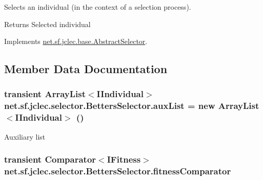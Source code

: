 Selects an individual (in the context of a selection process).

\begin{DoxyReturn}{Returns}
Selected individual
\end{DoxyReturn}
 

Implements \hyperlink{classnet_1_1sf_1_1jclec_1_1base_1_1_abstract_selector_aa2ccb539c608db9c14ebbc763807b95a}{net.\-sf.\-jclec.\-base.\-Abstract\-Selector}.



\subsection{Member Data Documentation}
\hypertarget{classnet_1_1sf_1_1jclec_1_1selector_1_1_betters_selector_ab1d403d53ac1f1cbb3d0ddd51fd0e160}{
\subsubsection[{aux\-List}]{\setlength{\rightskip}{0pt plus 5cm}transient Array\-List$<${\bf I\-Individual}$>$ net.\-sf.\-jclec.\-selector.\-Betters\-Selector.\-aux\-List = new Array\-List$<${\bf I\-Individual}$>$ ()\hspace{0.3cm}{\ttfamily [protected]}}}\label{classnet_1_1sf_1_1jclec_1_1selector_1_1_betters_selector_ab1d403d53ac1f1cbb3d0ddd51fd0e160}
Auxiliary list \hypertarget{classnet_1_1sf_1_1jclec_1_1selector_1_1_betters_selector_a6841f51f9dcb6e22c7e8c3875b324c34}{
\subsubsection[{fitness\-Comparator}]{\setlength{\rightskip}{0pt plus 5cm}transient Comparator$<${\bf I\-Fitness}$>$ net.\-sf.\-jclec.\-selector.\-Betters\-Selector.\-fitness\-Comparator\hspace{0.3cm}{\ttfamily [protected]}}}\label{classnet_1_1sf_1_1jclec_1_1selector_1_1_betters_selector_a6841f51f9dcb6e22c7e8c3875b324c34}
